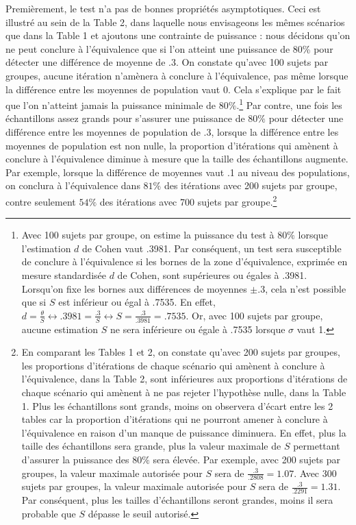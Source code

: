 \documentclass[
  english,
  man]{apa6}
\begin{document}
Premièrement, le test n'a pas de bonnes propriétés asymptotiques. Ceci est illustré au sein de la Table 2, dans laquelle nous envisageons les mêmes scénarios que dans la Table 1 et ajoutons une contrainte de puissance : nous décidons qu'on ne peut conclure à l'équivalence que si l'on atteint une puissance de 80\% pour détecter une différence de moyenne de .3. On constate qu'avec 100 sujets par groupes, aucune itération n'amènera à conclure à l'équivalence, pas même lorsque la différence entre les moyennes de population vaut 0. Cela s'explique par le fait que l'on n'atteint jamais la puissance minimale de \(80\%\).\footnote{Avec 100 sujets par groupe, on estime la puissance du test à $80\%$ lorsque l'estimation $d$ de Cohen vaut .3981. Par conséquent, un test sera susceptible de conclure à l'équivalence si les bornes de la zone d'équivalence, exprimée en mesure standardisée $d$ de Cohen, sont supérieures ou égales à .3981. Lorsqu'on fixe les bornes aux différences de moyennes $\pm .3$, cela n'est possible que si $S$ est inférieur ou égal à .7535. En effet, $d=\frac{\theta}{S} \leftrightarrow .3981 = \frac{.3}{S} \leftrightarrow S = \frac{.3}{.3981}=.7535$.  Or, avec 100 sujets par groupe, aucune estimation $S$ ne sera inférieure ou égale à .7535 lorsque $\sigma$ vaut 1.} Par contre, une fois les échantillons assez grands pour s'assurer une puissance de \(80\%\) pour détecter une différence entre les moyennes de population de .3, lorsque la différence entre les moyennes de population est non nulle, la proportion d'itérations qui amènent à conclure à l'équivalence diminue à mesure que la taille des échantillons augmente. Par exemple, lorsque la différence de moyennes vaut .1 au niveau des populations, on conclura à l'équivalence dans \(81\%\) des itérations avec 200 sujets par groupe, contre seulement \(54\%\) des itérations avec 700 sujets par groupe.\footnote{En comparant les Tables 1 et 2, on constate qu'avec 200 sujets par groupes, les proportions d'itérations de chaque scénario qui amènent à conclure à l'équivalence, dans la Table 2, sont inférieures aux proportions d'itérations de chaque scénario qui amènent à ne pas rejeter l'hypothèse nulle, dans la Table 1. Plus les échantillons sont grands, moins on observera d'écart entre les 2 tables car la proportion d'itérations qui ne pourront amener à conclure à l'équivalence en raison d'un manque de puissance diminuera. En effet, plus la taille des échantillons sera grande, plus la valeur maximale de $S$ permettant d'assurer la puissance des $80\%$ sera élevée. Par exemple, avec 200 sujets par groupes, la valeur maximale autorisée pour $S$ sera de $\frac{.3}{.2808}=1.07$. Avec 300 sujets par groupes, la valeur maximale autorisée pour $S$ sera de $\frac{.3}{.2291}=1.31$. Par conséquent, plus les tailles d'échantillons seront grandes, moins il sera probable que $S$ dépasse le seuil autorisé.}
\end{document}
